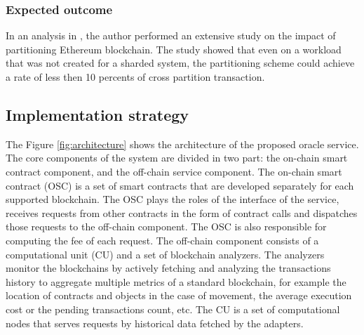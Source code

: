 

\subsubsection{Expected outcome}

In an analysis in \cite{fynn2020move}, the author performed an extensive study
on the impact of partitioning Ethereum blockchain. The study showed that even on
a workload that was not created for a sharded system, the partitioning scheme
could achieve a rate of less then 10 percents of cross partition transaction. 


\subsection{Implementation strategy}

The Figure \ref{fig:architecture} shows the architecture of the proposed oracle
service. The core components of the system are divided in two part: the on-chain
smart contract component, and the off-chain service component. The on-chain
smart contract (OSC) is a set of smart contracts that are developed separately
for each supported blockchain. The OSC plays the roles of the interface of the
service, receives requests from other contracts in the form of contract calls
and dispatches those requests to the off-chain component. The OSC is also
responsible for computing the fee of each request. The off-chain component
consists of a computational unit (CU) and a set of blockchain analyzers. The
analyzers monitor the blockchains by actively fetching and analyzing the
transactions history to aggregate multiple metrics of a standard blockchain, for
example the location of contracts and objects in the case of movement, the
average execution cost or the pending transactions count, etc. The CU is a set
of computational nodes that serves requests by historical data fetched by the
adapters.

